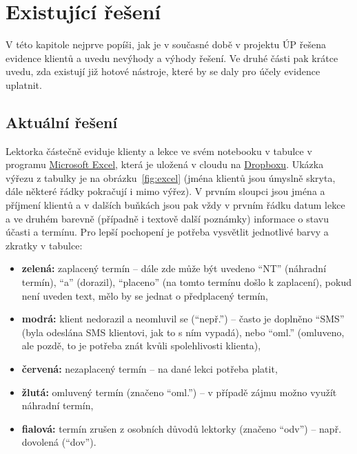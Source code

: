 \chapter{Existující řešení}
V této kapitole nejprve popíši, jak je v současné době v projektu ÚP řešena evidence klientů a uvedu nevýhody a výhody řešení. Ve druhé části pak krátce uvedu, zda existují již hotové nástroje, které by se daly pro účely evidence uplatnit.
    
    \section{Aktuální řešení}\label{aktualni-reseni}
    Lektorka částečně eviduje klienty a lekce ve svém notebooku v tabulce v programu \href{https://products.office.com/cs-cz/excel}{Microsoft Excel}, která je uložená v cloudu na \href{https://www.dropbox.com/}{Dropboxu}. Ukázka výřezu z tabulky je na obrázku~\ref{fig:excel} (jména klientů jsou úmyslně skryta, dále některé řádky pokračují i mimo výřez). V prvním sloupci jsou jména a příjmení klientů a v dalších buňkách jsou pak vždy v prvním řádku datum lekce a ve druhém barevně (případně i textově další poznámky) informace o stavu účasti a termínu. Pro lepší pochopení je potřeba vysvětlit jednotlivé barvy a zkratky v tabulce:
    
    \begin{itemize}
      \item \textbf{zelená:} zaplacený termín -- dále zde může být uvedeno \enquote{NT} (náhradní termín), \enquote{a} (dorazil), \enquote{placeno} (na tomto termínu došlo k zaplacení), pokud není uveden text, mělo by se jednat o předplacený termín,
      \item \textbf{modrá:} klient nedorazil a neomluvil se (\enquote{nepř.}) -- často je doplněno \enquote{SMS} (byla odeslána SMS klientovi, jak to s ním vypadá), nebo \enquote{oml.} (omluveno, ale pozdě, to je potřeba znát kvůli spolehlivosti klienta),
      \item \textbf{červená:} nezaplacený termín -- na dané lekci potřeba platit,
      \item \textbf{žlutá:} omluvený termín (značeno \enquote{oml.}) -- v případě zájmu možno využít náhradní termín,
      \item \textbf{fialová:} termín zrušen z osobních důvodů lektorky (značeno \enquote{odv}) -- např. dovolená (\enquote{dov}).
    \end{itemize}
    
